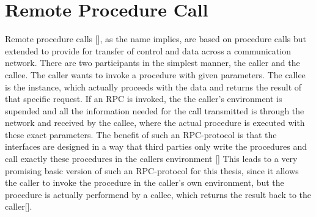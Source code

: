 \section{Remote Procedure Call}
Remote procedure calls [], as the name implies, are based on procedure calls but extended
to provide for transfer of control and data across a communication network. There are
two participants in the simplest manner, the caller and the callee. The caller wants to invoke a
procedure with given parameters. The callee is the instance, which actually proceeds with
the data and returns the result of that specific request. If an RPC is invoked, the the caller’s
environment is supended and all the information needed for the call transmitted is through the
network and received by the callee, where the actual procedure is executed with these exact
parameters. The benefit of such an RPC-protocol is that the interfaces are designed in a
way that third parties only write the procedures and call exactly these procedures in the
callers environment [] This leads to a very promising basic version of such
an RPC-protocol for this thesis, since it allows the caller to invoke the procedure in the caller's own  environment, but the procedure is actually performend by a callee, which returns the result back to the caller[].